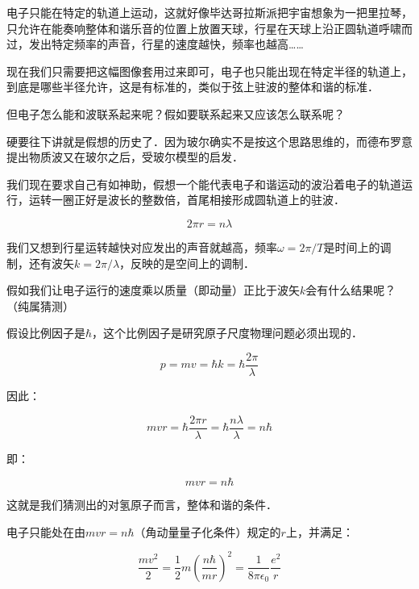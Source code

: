 电子只能在特定的轨道上运动，这就好像毕达哥拉斯派把宇宙想象为一把里拉琴，只允许在能奏响整体和谐乐音的位置上放置天球，行星在天球上沿正圆轨道呼啸而过，发出特定频率的声音，行星的速度越快，频率也越高……

现在我们只需要把这幅图像套用过来即可，电子也只能出现在特定半径的轨道上，到底是哪些半径允许，这是有标准的，类似于弦上驻波的整体和谐的标准．


但电子怎么能和波联系起来呢？假如要联系起来又应该怎么联系呢？

硬要往下讲就是假想的历史了．因为玻尔确实不是按这个思路思维的，而德布罗意提出物质波又在玻尔之后，受玻尔模型的启发．

我们现在要求自己有如神助，假想一个能代表电子和谐运动的波沿着电子的轨道运行，运转一圈正好是波长的整数倍，首尾相接形成圆轨道上的驻波．

\begin{equation}
2 \pi r = n \lambda
\end{equation}

我们又想到行星运转越快对应发出的声音就越高，频率$\omega = 2 \pi /T$是时间上的调制，还有波矢$k = 2 \pi / \lambda$，反映的是空间上的调制．

假如我们让电子运行的速度乘以质量（即动量）正比于波矢$k$会有什么结果呢？（纯属猜测）

假设比例因子是$\hbar$，这个比例因子是研究原子尺度物理问题必须出现的．

\begin{equation}
p = m v = \hbar k = \hbar \frac{2 \pi }{\lambda}
\end{equation}

因此：

\begin{equation}
m v r = \hbar \frac{2 \pi r}{\lambda} = \hbar \frac{ n \lambda }{ \lambda} = n \hbar
\end{equation}

即：

\begin{equation}
mvr = n \hbar 
\end{equation}

这就是我们猜测出的对氢原子而言，整体和谐的条件．

电子只能处在由$mvr=n \hbar$（角动量量子化条件）规定的$r$上，并满足：

\begin{equation}
\frac{m v^2}{2} = \frac{1}{2} m \left(  \frac{ n \hbar  }{ m r }  \right)^2 = \frac{1}{8 \pi \epsilon_0 } \frac{e^2 }{r }  
\end{equation}

